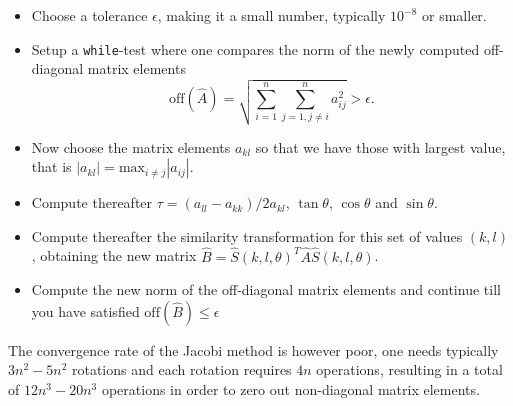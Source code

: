 \begin{itemize}
   \item Choose a tolerance $\epsilon$, making it a small number, typically $10^{-8}$ or smaller.
   \item Setup a \lstinline{while}-test  where one compares the norm of the newly computed off-diagonal
matrix elements  \[ \mathrm{off}(\hat{A}) = \sqrt{\sum_{i=1}^n\sum_{j=1,j\ne i}^n a_{ij}^2}   >  \epsilon. \]
   \item Now choose the matrix elements $a_{kl}$ so that we have those with largest value, that is
$|a_{kl}|=\mathrm{max}_{i\ne j} |a_{ij}|$.
\item Compute thereafter $\tau = (a_{ll}-a_{kk})/2a_{kl}$, $\tan\theta$, $\cos\theta$ and
$\sin\theta$.
\item Compute thereafter the similarity transformation for this set of values $(k,l)$, obtaining the 
new matrix $\hat{B}= \hat{S}(k,l,\theta)^T \hat{A}\hat{S}(k,l,\theta)$.
   \item Compute the new norm of the off-diagonal matrix elements and continue till you have satisfied 
$\mathrm{off}(\hat{B})  \le  \epsilon$
\end{itemize}


The convergence rate of the Jacobi method is however poor, one needs typically $3n^2-5n^2$ rotations and each rotation 
requires $4n$ operations, resulting in a total of $12n^3-20n^3$ operations in order to zero out non-diagonal matrix elements.



